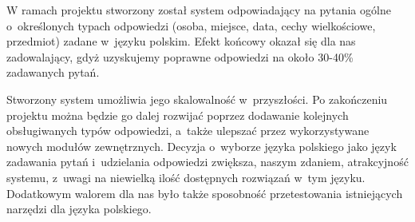 W ramach projektu stworzony został system odpowiadający na pytania ogólne o~określonych typach odpowiedzi (osoba, miejsce, data, cechy wielkościowe, przedmiot) zadane w~języku polskim. Efekt końcowy okazał się dla nas zadowalający, gdyż uzyskujemy poprawne odpowiedzi na około 30-40\% zadawanych pytań.

Stworzony system umożliwia jego skalowalność w~przyszłości. Po zakończeniu projektu można będzie go dalej rozwijać poprzez dodawanie kolejnych obsługiwanych typów odpowiedzi, a~także ulepszać przez wykorzystywane nowych modułów zewnętrznych.  Decyzja o~wyborze języka polskiego jako język zadawania pytań i~udzielania odpowiedzi zwiększa, naszym zdaniem, atrakcyjność systemu, z~uwagi na niewielką ilość dostępnych rozwiązań w~tym języku. Dodatkowym walorem dla nas było także sposobność przetestowania istniejących narzędzi dla języka polskiego.


